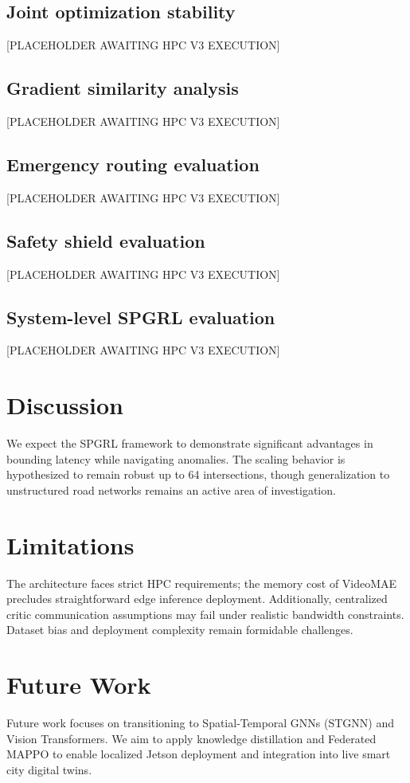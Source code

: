 \documentclass[journal]{IEEEtran}
\begin{document}
\subsection{Joint optimization stability}
[PLACEHOLDER AWAITING HPC V3 EXECUTION]
\subsection{Gradient similarity analysis}
[PLACEHOLDER AWAITING HPC V3 EXECUTION]
\subsection{Emergency routing evaluation}
[PLACEHOLDER AWAITING HPC V3 EXECUTION]
\subsection{Safety shield evaluation}
[PLACEHOLDER AWAITING HPC V3 EXECUTION]
\subsection{System-level SPGRL evaluation}
[PLACEHOLDER AWAITING HPC V3 EXECUTION]

\section{Discussion}
\label{sec:discussion}
We expect the SPGRL framework to demonstrate significant advantages in bounding latency while navigating anomalies. The scaling behavior is hypothesized to remain robust up to 64 intersections, though generalization to unstructured road networks remains an active area of investigation.

\section{Limitations}
\label{sec:limitations}
The architecture faces strict HPC requirements; the memory cost of VideoMAE precludes straightforward edge inference deployment. Additionally, centralized critic communication assumptions may fail under realistic bandwidth constraints. Dataset bias and deployment complexity remain formidable challenges.

\section{Future Work}
\label{sec:future_work}
Future work focuses on transitioning to Spatial-Temporal GNNs (STGNN) and Vision Transformers. We aim to apply knowledge distillation and Federated MAPPO to enable localized Jetson deployment and integration into live smart city digital twins.
\end{document}
